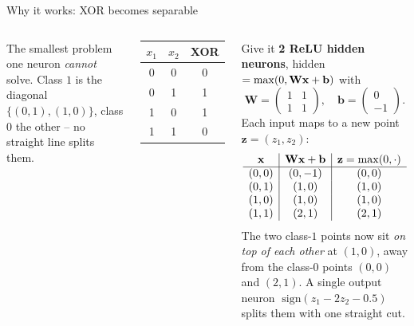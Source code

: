 \documentclass[aspectratio=169]{beamer}
\begin{document}
\begin{frame}{Why it works: XOR becomes separable}
  \begin{columns}[T]
    \footnotesize
    The smallest problem one neuron \emph{cannot} solve. Class $1$ is the diagonal
    $\{(0,1),(1,0)\}$, class $0$ the other -- no straight line splits them.
    \vskip 2pt
    \begin{center}\scriptsize
      \begin{tabular}{cc|c}
        $x_1$ & $x_2$ & XOR \\ \hline
        0 & 0 & 0 \\
        0 & 1 & 1 \\
        1 & 0 & 1 \\
        1 & 1 & 0 \\
      \end{tabular}
    \end{center}
    \vskip 2pt
    Give it \textbf{2 ReLU hidden neurons}, hidden $=\max(0,\mathbf{W}\mathbf{x}+\mathbf{b})$ with
    \[
      \mathbf{W}=\begin{pmatrix} 1 & 1\\ 1 & 1\end{pmatrix},\quad
      \mathbf{b}=\begin{pmatrix} 0\\ -1\end{pmatrix}.
    \]
    \footnotesize
    Each input maps to a new point $\mathbf{z}=(z_1,z_2)$:
    \[
      \begin{array}{c|c|c}
        \mathbf{x} & \mathbf{W}\mathbf{x}+\mathbf{b} & \mathbf{z}=\max(0,\cdot) \\ \hline
        (0,0) & (0,-1) & (0,0) \\
        (0,1) & (1,0)  & (1,0) \\
        (1,0) & (1,0)  & (1,0) \\
        (1,1) & (2,1)  & (2,1) \\
      \end{array}
    \]
    The two class-$1$ points now sit \emph{on top of each other} at $(1,0)$, away from the
    class-$0$ points $(0,0)$ and $(2,1)$. A single output neuron
    $\;\mathrm{sign}(z_1 - 2z_2 - 0.5)\;$ splits them with one straight cut.
    \vskip 3pt
  \end{columns}
\end{frame}
\end{document}
